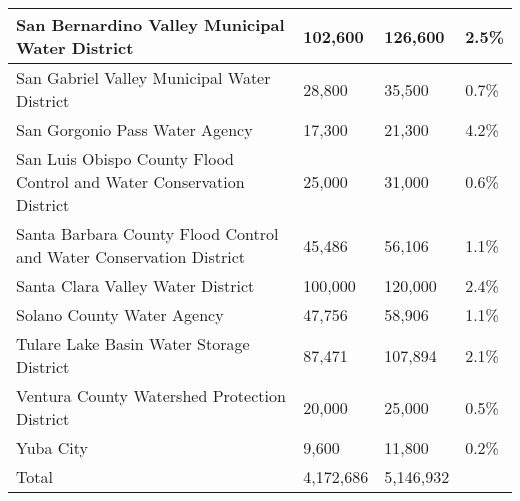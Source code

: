\documentclass{article}
\begin{document}
\begin{table}[!ht]
\begin{tabular}{|l|l|l|l|}
        San Bernardino Valley Municipal Water District & 102,600 & 126,600 & 2.5\%  \\ \hline
        San Gabriel Valley Municipal Water District & 28,800 & 35,500 & 0.7\%  \\ \hline
        San Gorgonio Pass Water Agency & 17,300 & 21,300 & 4.2\%  \\ \hline
        San Luis Obispo County Flood Control and Water Conservation District & 25,000 & 31,000 & 0.6\%  \\ \hline
        Santa Barbara County Flood Control and Water Conservation District & 45,486 & 56,106 & 1.1\%  \\ \hline
        Santa Clara Valley Water District & 100,000 & 120,000 & 2.4\%  \\ \hline
        Solano County Water Agency & 47,756 & 58,906 & 1.1\%  \\ \hline
        Tulare Lake Basin Water Storage District & 87,471 & 107,894 & 2.1\%  \\ \hline
        Ventura County Watershed Protection District & 20,000 & 25,000 & 0.5\%  \\ \hline
        Yuba City & 9,600 & 11,800 & 0.2\%  \\ \hline
        Total & 4,172,686 & 5,146,932 &   \\ \hline
    \end{tabular}
\end{table}
\end{document}
